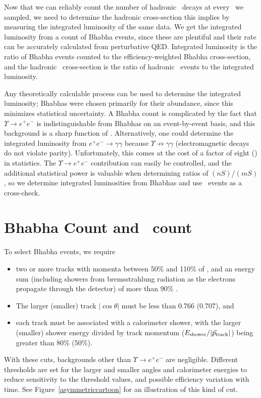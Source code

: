 \documentclass{cornell}
\begin{document}
Now that we can reliably count the number of hadronic \ups\ decays at
every \ecm\ we sampled, we need to determine the hadronic
cross-section this implies by measuring the integrated luminosity of
the same data.  We get the integrated luminosity from a count of
Bhabha events, since these are plentiful and their rate can be
accurately calculated from perturbative QED.  Integrated luminosity is
the ratio of Bhabha events counted to the efficiency-weighted Bhabha
cross-section, and the hadronic \ups\ cross-section is the ratio of
hadronic \ups\ events to the integrated luminosity.

Any theoretically calculable process can be used to determine the
integrated luminosity; Bhabhas were chosen primarily for their
abundance, since this minimizes statistical uncertainty.  A Bhabha
count is complicated by the fact that $\Upsilon \to e^+e^-$ is
indistinguishable from Bhabhas on an event-by-event basis, and this
background is a sharp function of \ecm.  Alternatively, one could
determine the integrated luminosity from $e^+e^- \to \gamma\gamma$
because $\Upsilon \not\to \gamma\gamma$ (electromagnetic decays do not
violate parity).  Unfortunately, this comes at the cost of a factor of
eight (\borky) in statistics.  The $\Upsilon \to e^+e^-$ contribution
can easily be controlled, and the additional statistical power is
valuable when determining ratios of \gee$(nS)$/\gee$(mS)$, so we
determine integrated luminosities from Bhabhas and use \gamgam\ events
as a cross-check.

\section{Bhabha Count and \boldmath \gamgam\ count}

To select Bhabha events, we require
\begin{itemize}

  \item two or more tracks with momenta between 50\% and 110\% of
    \ebeam, and an energy sum (including showers from bremsstrahlung
    radiation as the electrons propagate through the detector) of more
    than 90\% \ecm.

  \item The larger (smaller) track $|\cos\theta|$ must be less than
    0.766 (0.707), and

  \item each track must be associated with a calorimeter shower, with the
    larger (smaller) shower energy divided by track momentum
    ($E_{\mbox{\scriptsize shower}}/|\vec{p}_{\mbox{\scriptsize track}}|$) being greater than 80\%
    (50\%).

\end{itemize}
With these cuts, backgrounds other than $\Upsilon \to e^+e^-$ are
negligible.  Different thresholds are set for the larger and smaller
angles and calorimeter energies to reduce sensitivity to the threshold
values, and possible efficiency variation with time.  See Figure~\ref{asymmetriccartoon} for an illustration of this kind of cut.
\end{document}
